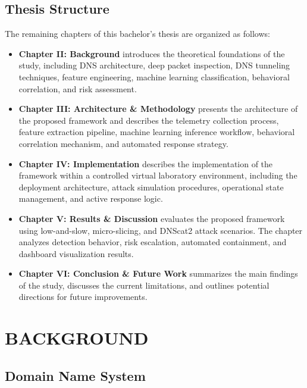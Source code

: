 \documentclass[14pt, a4paper, oneside]{report}
\begin{document}
\section{Thesis Structure}
\label{sec:thesis_structure}
The remaining chapters of this bachelor's thesis are organized as follows:
\begin{itemize}
    \item \textbf{Chapter II: Background} introduces the theoretical foundations of the study, including DNS architecture, deep packet inspection, DNS tunneling techniques, feature engineering, machine learning classification, behavioral correlation, and risk assessment.
    \item \textbf{Chapter III: Architecture \& Methodology} presents the architecture of the proposed framework and describes the telemetry collection process, feature extraction pipeline, machine learning inference workflow, behavioral correlation mechanism, and automated response strategy.
    \item \textbf{Chapter IV: Implementation} describes the implementation of the framework within a controlled virtual laboratory environment, including the deployment architecture, attack simulation procedures, operational state management, and active response logic.
    \item \textbf{Chapter V: Results \& Discussion} evaluates the proposed framework using low-and-slow, micro-slicing, and DNScat2 attack scenarios. The chapter analyzes detection behavior, risk escalation, automated containment, and dashboard visualization results.
    \item \textbf{Chapter VI: Conclusion \& Future Work} summarizes the main findings of the study, discusses the current limitations, and outlines potential directions for future improvements.
\end{itemize}

\chapter{BACKGROUND}
\label{chapt:background}

\section{Domain Name System}
\label{sec:dns_foundations}
\end{document}
